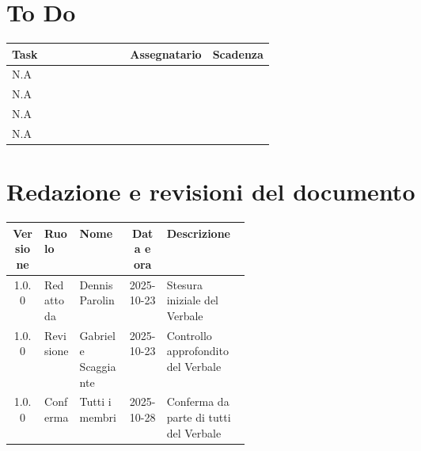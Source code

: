 \documentclass[a4paper,12pt]{article}
\begin{document}
\section{To Do}

\begin{center}
\small
\renewcommand{\arraystretch}{1.2}
\begin{tabular}{|>{\raggedright\arraybackslash}p{0.45\linewidth}|c|c|}
\hline
\rowcolor{gray!60}
\textbf{Task} & \textbf{Assegnatario} & \textbf{Scadenza} \\
\hline
\rowcolor{white}
N.A &  &  \\
\hline
\rowcolor{gray!20}
N.A &  &  \\
\hline
\rowcolor{white}
N.A &  &  \\
\hline
\rowcolor{gray!20}
N.A &  &  \\
\hline
\end{tabular}
\end{center}

\clearpage
\section{Redazione e revisioni del documento}

\begin{center}
\small
\renewcommand{\arraystretch}{1.2}
\begin{tabular}{|c|l|l|c|>{\raggedright\arraybackslash}p{0.35\linewidth}|}
\hline
\rowcolor{gray!60}
\textbf{Versione} & \textbf{Ruolo} & \textbf{Nome} & \textbf{Data e ora} & \textbf{Descrizione} \\
\hline
\rowcolor{white}
1.0.0 & Redatto da & Dennis Parolin & 2025-10-23 & Stesura iniziale del Verbale \\
\hline
\rowcolor{gray!20}
1.0.0 & Revisione & Gabriele Scaggiante & 2025-10-23 & Controllo approfondito del Verbale \\
\hline
\rowcolor{white}
1.0.0 & Conferma & Tutti i membri & 2025-10-28 & Conferma da parte di tutti del Verbale \\
\hline
\end{tabular}
\end{center}


\end{document}
